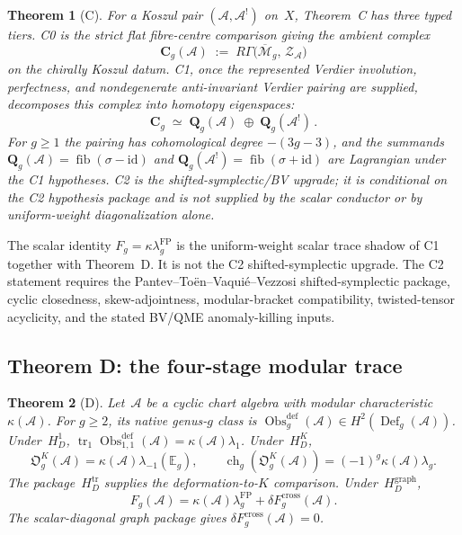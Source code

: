 \documentclass[11pt,reqno]{amsart}
\newtheorem{theorem}{Theorem}[section]
\theoremstyle{definition}
\theoremstyle{remark}
\providecommand{\cA}{\mathcal{A}}
\providecommand{\cM}{\mathcal{M}}
\numberwithin{equation}{section}
\begin{document}
\begin{theorem}[C]\label{thm:C}
For a Koszul pair $(\cA, \cA^!)$ on~$X$, Theorem~C has three typed
tiers.  \textsc{C0} is the strict flat fibre-centre comparison giving
the ambient complex
\[
\mathbf{C}_g(\cA)
\;:=\;
R\Gamma\bigl(\overline{\cM}_g,\, \mathcal{Z}_\cA\bigr)
\]
on the chirally Koszul datum.  \textsc{C1}, once the represented
Verdier involution, perfectness, and nondegenerate anti-invariant
Verdier pairing are supplied, decomposes this complex into homotopy
eigenspaces:
\begin{equation}\label{eq:complementarity}
\mathbf{C}_g
\;\simeq\;
\mathbf{Q}_g(\cA) \;\oplus\; \mathbf{Q}_g(\cA^!)\,.
\end{equation}
For $g \ge 1$ the pairing has cohomological degree $-(3g-3)$, and
the summands $\mathbf{Q}_g(\cA)=
\operatorname{fib}(\sigma-\mathrm{id})$ and
$\mathbf{Q}_g(\cA^!)=\operatorname{fib}(\sigma + \mathrm{id})$
are Lagrangian under the C1 hypotheses.  \textsc{C2} is the
shifted-symplectic/BV upgrade; it is conditional on the C2 hypothesis
package and is not supplied by the scalar conductor or by
uniform-weight diagonalization alone.
\end{theorem}

The scalar identity $F_g=\kappa\lambda_g^{\mathrm{FP}}$ is the
uniform-weight scalar trace shadow of C1 together with Theorem~D.  It
is not the C2 shifted-symplectic upgrade.  The C2 statement requires
the Pantev--To\"en--Vaqui\'e--Vezzosi shifted-symplectic package,
cyclic closedness, skew-adjointness, modular-bracket compatibility,
twisted-tensor acyclicity, and the stated BV/QME anomaly-killing
inputs.

\subsection{Theorem D: the four-stage modular trace}
\label{ssec:thm-d}

\begin{theorem}[D]\label{thm:D}
Let~$\cA$ be a cyclic chart algebra with modular characteristic
$\kappa(\cA)$.  For $g\geq2$, its native genus-$g$ class is
$\operatorname{Obs}^{\mathrm{def}}_g(\cA)\in
H^2(\operatorname{Def}_g(\cA))$.  Under~$H_D^1$,
$\operatorname{tr}_1\operatorname{Obs}^{\mathrm{def}}_{1,1}(\cA)
=\kappa(\cA)\lambda_1$.  Under~$H_D^K$,
\[
 \mathfrak O_g^K(\cA)=\kappa(\cA)\lambda_{-1}(\mathbb E_g),
 \qquad
 \operatorname{ch}_g(\mathfrak O_g^K(\cA))
 =(-1)^g\kappa(\cA)\lambda_g.
\]
The package~$H_D^{\mathrm{tr}}$ supplies the deformation-to-$K$
comparison.  Under~$H_D^{\mathrm{graph}}$,
\[
 F_g(\cA)=\kappa(\cA)\lambda_g^{\mathrm{FP}}
 +\delta F_g^{\mathrm{cross}}(\cA).
\]
The scalar-diagonal graph package gives
$\delta F_g^{\mathrm{cross}}(\cA)=0$.
\end{theorem}
\end{document}

